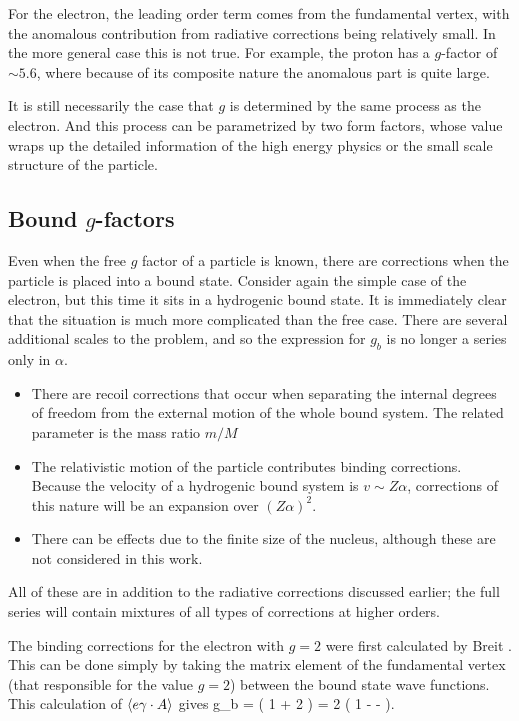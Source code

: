 For the electron, the leading order term comes from the fundamental vertex, with the anomalous contribution from radiative corrections being relatively small.  In the more general case this is not true.  For example, the proton has a $g$-factor of $\sim 5.6$, where because of its composite nature the anomalous part is quite large.

It is still necessarily the case that $g$ is determined by the same process as the electron.  And this process can be parametrized by two form factors, whose value wraps up the detailed information of the high energy physics or the small scale structure of the particle. 

\subsection{Bound $g$-factors}

Even when the free $g$ factor of a particle is known, there are corrections when the particle is placed into a bound state.  Consider again the simple case of the electron, but this time it sits in a hydrogenic bound state.  It is immediately clear that the situation is much more complicated than the free case.  There are several additional scales to the problem, and so the expression for $g_b$ is no longer a series only in $\alpha$.
\begin{itemize}
  \item 	There are recoil corrections that occur when separating the internal degrees of freedom from the external motion of the whole bound system.  The related parameter is the mass ratio $m/M$	%
  \item 	The relativistic motion of the particle contributes binding corrections.  Because the velocity of a hydrogenic bound system is $v \sim Z\alpha$, corrections of this nature will be an expansion over $(Z\alpha)^2$.
  \item		There can be effects due to the finite size of the nucleus, although these are not considered in this work.
\end{itemize}
All of these are in addition to the radiative corrections discussed earlier; the full series will contain mixtures of all types of corrections at higher orders.

The binding corrections for the electron with $g=2$ were first calculated by Breit \cite{Breit1928}.  This can be done simply by taking the matrix element of the fundamental vertex (that responsible for the value $g=2$)  between the bound state wave functions.  This calculation of $\left<  e\gamma \cdot A \right>$ gives
\beq 
	g_b =  \left( 1 + 2 \right)  = 2 \left( 1 -  -  \right ).
\eeq

